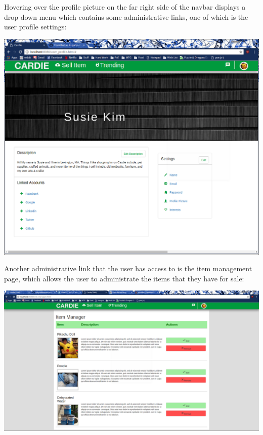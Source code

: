 \documentclass[10pt, titlepage]{article}
\begin{document}
\pagebreak

\noindent Hovering over the profile picture on the far right side of the navbar displays a drop down menu which contains some administrative links, one of which is the user profile settings: \\

\centerline{\includegraphics[scale=.4]{screen_06}}

\pagebreak

\noindent Another administrative link that the user has access to is the item management page, which allows the user to administrate the items that they have for sale: \\

\centerline{\includegraphics[scale=.25]{screen_09}}

\pagebreak
\end{document}
